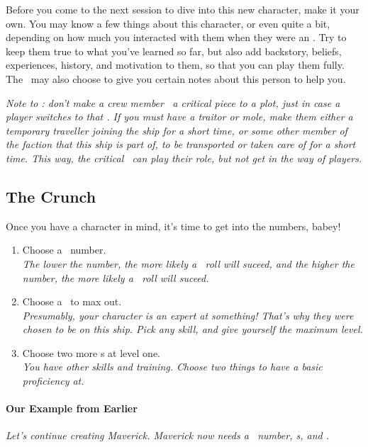 \par
Before you come to the next session to dive into this new character, make it your own. You may know a few things about this character, or even quite a bit, depending on how much you interacted with them when they were an \npcShort. Try to keep them true to what you've learned so far, but also add backstory, beliefs, experiences, history, and motivation to them, so that you can play them fully. The \gm\, may also choose to give you certain notes about this person to help you.

\par
\textit{Note to \gm : don't make a crew member \npcShort\, a critical piece to a plot, just in case a player switches to that \npcShort . If you must have a traitor or mole, make them either a temporary traveller joining the ship for a short time, or some other member of the faction that this ship is part of, to be transported or taken care of for a short time. This way, the critical \npcShort\, can play their role, but not get in the way of players.}

\subsection{The Crunch}

\par
Once you have a character in mind, it's time to get into the numbers, babey!
\begin{enumerate}
	\item Choose a \both\, number. \\
		\textit{The lower the number, the more likely a \lasers\, roll will suceed, and the higher the number, the more likely a \feelings\, roll will suceed.}
	\item Choose a \skill\, to max out.\\
		\textit{Presumably, your character is an expert at something! That's why they were chosen to be on this ship. Pick any skill, and give yourself the maximum level.}
	\item Choose two more \skill s at level one. \\
		\textit{You have other skills and training. Choose two things to have a basic proficiency at.}
\end{enumerate}

\paragraph{Our Example from Earlier}
\textit{Let's continue creating Maverick. Maverick now needs a \both\, number, \skill s, and \abilityP .}